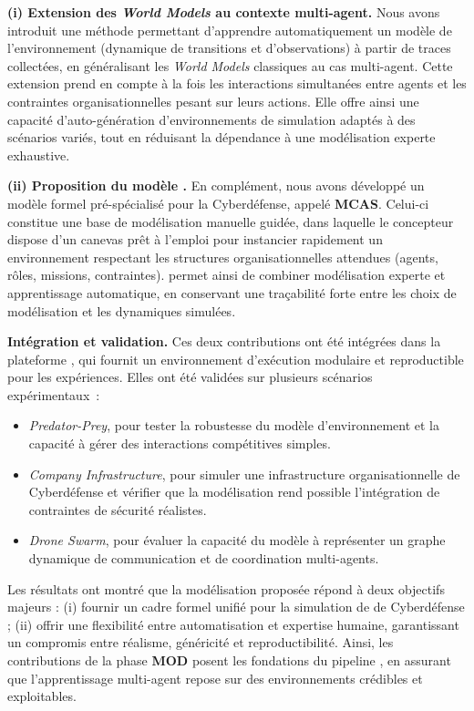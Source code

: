 \medskip
\noindent
\textbf{(i) Extension des \textit{World Models} au contexte multi-agent.}
Nous avons introduit une méthode permettant d'apprendre automatiquement un modèle de l'environnement (dynamique de transitions et d'observations) à partir de traces collectées, en généralisant les \textit{World Models} classiques au cas multi-agent.
Cette extension prend en compte à la fois les interactions simultanées entre agents et les contraintes organisationnelles pesant sur leurs actions.
Elle offre ainsi une capacité d'auto-génération d'environnements de simulation adaptés à des scénarios variés, tout en réduisant la dépendance à une modélisation experte exhaustive.

\medskip
\noindent
\textbf{(ii) Proposition du modèle .}
En complément, nous avons développé un modèle formel  pré-spécialisé pour la Cyberdéfense, appelé \textbf{MCAS}.
Celui-ci constitue une base de modélisation manuelle guidée, dans laquelle le concepteur dispose d'un canevas prêt à l'emploi pour instancier rapidement un environnement respectant les structures organisationnelles attendues (agents, rôles, missions, contraintes).
 permet ainsi de combiner modélisation experte et apprentissage automatique, en conservant une traçabilité forte entre les choix de modélisation et les dynamiques simulées.

\medskip
\noindent
\textbf{Intégration et validation.}
Ces deux contributions ont été intégrées dans la plateforme , qui fournit un environnement d'exécution modulaire et reproductible pour les expériences.
Elles ont été validées sur plusieurs scénarios expérimentaux~:
\begin{itemize}
  \item \textit{Predator-Prey}, pour tester la robustesse du modèle d'environnement et la capacité à gérer des interactions compétitives simples.
  \item \textit{Company Infrastructure}, pour simuler une infrastructure organisationnelle de Cyberdéfense et vérifier que la modélisation rend possible l'intégration de contraintes de sécurité réalistes.
  \item \textit{Drone Swarm}, pour évaluer la capacité du modèle à représenter un graphe dynamique de communication et de coordination multi-agents.
\end{itemize}

\noindent
Les résultats ont montré que la modélisation proposée répond à deux objectifs majeurs :
(i) fournir un cadre formel unifié pour la simulation de  de Cyberdéfense ;
(ii) offrir une flexibilité entre automatisation et expertise humaine, garantissant un compromis entre réalisme, généricité et reproductibilité.
Ainsi, les contributions de la phase \textbf{MOD} posent les fondations du pipeline , en assurant que l'apprentissage multi-agent repose sur des environnements crédibles et exploitables.



